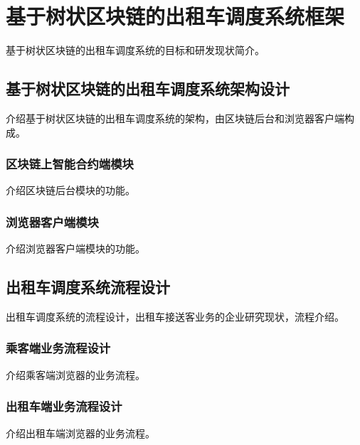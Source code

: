 \chapter{基于树状区块链的出租车调度系统框架}
基于树状区块链的出租车调度系统的目标和研发现状简介。
\section{基于树状区块链的出租车调度系统架构设计}
介绍基于树状区块链的出租车调度系统的架构，由区块链后台和浏览器客户端构成。
\subsection{区块链上智能合约端模块}
介绍区块链后台模块的功能。
\subsection{浏览器客户端模块}
介绍浏览器客户端模块的功能。

\section{出租车调度系统流程设计}
出租车调度系统的流程设计，出租车接送客业务的企业研究现状，流程介绍。
\subsection{乘客端业务流程设计}
介绍乘客端浏览器的业务流程。
\subsection{出租车端业务流程设计}
介绍出租车端浏览器的业务流程。